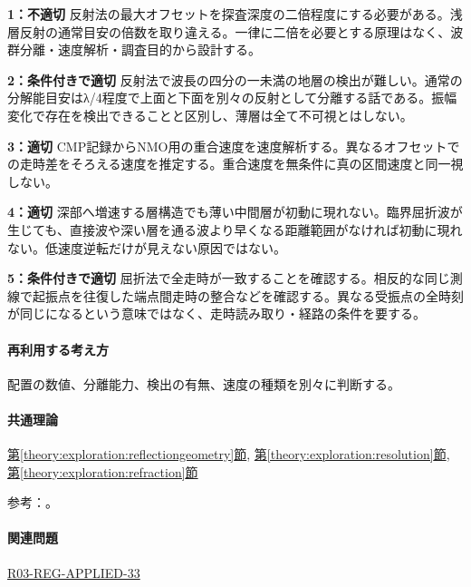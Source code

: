 \noindent\textbf{1：不適切} 反射法の最大オフセットを探査深度の二倍程度にする必要がある。浅層反射の通常目安の倍数を取り違える。一律に二倍を必要とする原理はなく、波群分離・速度解析・調査目的から設計する。\par

\noindent\textbf{2：条件付きで適切} 反射法で波長の四分の一未満の地層の検出が難しい。通常の分解能目安はλ/4程度で上面と下面を別々の反射として分離する話である。振幅変化で存在を検出できることと区別し、薄層は全て不可視とはしない。\par

\noindent\textbf{3：適切} CMP記録からNMO用の重合速度を速度解析する。異なるオフセットでの走時差をそろえる速度を推定する。重合速度を無条件に真の区間速度と同一視しない。\par

\noindent\textbf{4：適切} 深部へ増速する層構造でも薄い中間層が初動に現れない。臨界屈折波が生じても、直接波や深い層を通る波より早くなる距離範囲がなければ初動に現れない。低速度逆転だけが見えない原因ではない。\par

\noindent\textbf{5：条件付きで適切} 屈折法で全走時が一致することを確認する。相反的な同じ測線で起振点を往復した端点間走時の整合などを確認する。異なる受振点の全時刻が同じになるという意味ではなく、走時読み取り・経路の条件を要する。\par

\paragraph{再利用する考え方} 配置の数値、分離能力、検出の有無、速度の種類を別々に判断する。

\paragraph{共通理論} \hyperref[theory:exploration:reflectiongeometry]{第\ref*{theory:exploration:reflectiongeometry}節}, \hyperref[theory:exploration:resolution]{第\ref*{theory:exploration:resolution}節}, \hyperref[theory:exploration:refraction]{第\ref*{theory:exploration:refraction}節}

\par 参考：\cite{jica_refraction2015,usgs_refraction2013,epa_surfacewaves,xia_rayleigh1999,coastal_reflection2016,seg_vertical_resolution,usgs_processing2000}。

\paragraph{関連問題} \hyperref[q:r03-reg-applied-33]{R03-REG-APPLIED-33}

